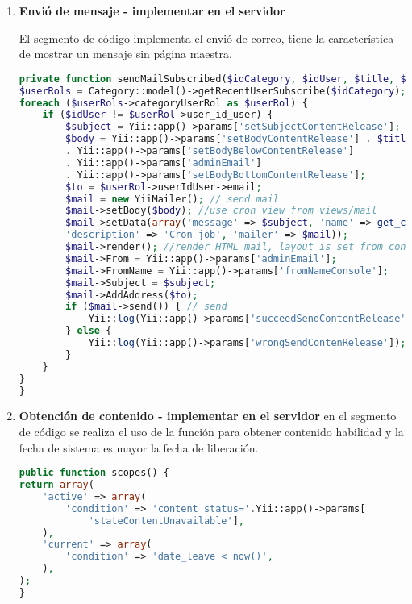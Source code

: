 \begin{itemize}
\begin{enumerate}

\item \textbf{Envió de mensaje - implementar en el servidor}

El segmento de código implementa el envió de correo, tiene la característica
de mostrar un mensaje sin página maestra.

\begin{lstlisting}[language=PHP, caption={Envió de mensaje sin  contenedor de página.}]
private function sendMailSubscribed($idCategory, $idUser, $title, $summary) {
$userRols = Category::model()->getRecentUserSubscribe($idCategory);
foreach ($userRols->categoryUserRol as $userRol) {
    if ($idUser != $userRol->user_id_user) {
        $subject = Yii::app()->params['setSubjectContentRelease'];
        $body = Yii::app()->params['setBodyContentRelease'] . $title . $summary
        . Yii::app()->params['setBodyBelowContentRelease'] 
        . Yii::app()->params['adminEmail']
        . Yii::app()->params['setBodyBottomContentRelease'];
        $to = $userRol->userIdUser->email;
        $mail = new YiiMailer(); // send mail
        $mail->setBody($body); //use cron view from views/mail
        $mail->setData(array('message' => $subject, 'name' => get_class($this), 
        'description' => 'Cron job', 'mailer' => $mail));
        $mail->render(); //render HTML mail, layout is set from config file
        $mail->From = Yii::app()->params['adminEmail'];
        $mail->FromName = Yii::app()->params['fromNameConsole'];
        $mail->Subject = $subject;
        $mail->AddAddress($to);
        if ($mail->send()) { // send
            Yii::log(Yii::app()->params['succeedSendContentRelease']); 
        } else {
            Yii::log(Yii::app()->params['wrongSendContenRelease']);
        }
    }
}
}
\end{lstlisting}

\item \textbf{Obtención de contenido - implementar en el servidor}
en el segmento de código se realiza el uso de la función 
para obtener contenido habilidad y la fecha de sistema es mayor la fecha
de liberación.

\begin{lstlisting}[language=PHP, caption={Obtención de contenido para liberar podcast.}]
public function scopes() {
return array(
    'active' => array(
        'condition' => 'content_status='.Yii::app()->params[
            'stateContentUnavailable'],
    ),
    'current' => array(
        'condition' => 'date_leave < now()',
    ),
);
}
\end{lstlisting}

\end{enumerate}

\end{itemize}

